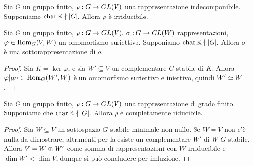 \begin{corollary}
Sia $G$ un gruppo finito, $\rho:G\to GL(V)$ una rappresentazione indecomponibile. Supponiamo $\operatorname{char}\mathbb{K}\nmid |G|$. Allora $\rho$ è irriducibile.
\end{corollary}

\begin{corollary}
Sia $G$ un gruppo finito, $\rho:G\to GL(V),\,\allowbreak\sigma:G\to GL(W)$ rappresentazioni, $\varphi\in\operatorname{Hom}_G(V,W)$ un omomorfismo suriettivo. Supponiamo $\operatorname{char}\mathbb{K}\nmid|G|$. Allora $\sigma$ è una sottorappresentazione di $\rho$.
\end{corollary}
\begin{proof}
Sia $K=\ker\varphi$, e sia $W'\subseteq V$ un complementare $G$-stabile di $K$. Allora $\varphi|_{W'}\in\operatorname{Hom}_G(W',W)$ è un omomorfismo suriettivo e iniettivo, quindi $W'\simeq W$.
\end{proof}


\begin{proposition}
Sia $G$ un gruppo finito, $\rho:G\to GL(V)$ una rappresentazione di grado finito. Supponiamo che $\operatorname{char}\mathbb{K}\nmid|G|$. Allora $\rho$ è completamente riducibile.
\end{proposition}
\begin{proof}
Sia $W\subseteq V$ un sottospazio $G$-stabile minimale non nullo. Se $W=V$ non c'è nulla da dimostrare, altrimenti per la  esiste un complementare $W'$ di $W$ $G$-stabile. Allora $V=W\oplus W'$ come somma di rappresentazioni con $W$ irriducibile e $\dim W'<\dim V$, dunque si può concludere per induzione.
\end{proof}

